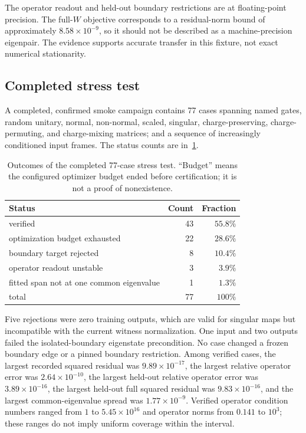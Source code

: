 \documentclass[11pt]{article}
\numberwithin{equation}{section}
\theoremstyle{definition}
\theoremstyle{remark}
\begin{document}
The operator readout and held-out boundary restrictions are at floating-point
precision.  The full-$W$ objective corresponds to a residual-norm bound of
approximately $8.58\times10^{-9}$, so it should not be described as a
machine-precision eigenpair.  The evidence supports accurate transfer in this
fixture, not exact numerical stationarity.

\subsection{Completed stress test}

A completed, confirmed smoke campaign contains 77 cases spanning named gates,
random unitary, normal, non-normal, scaled, singular, charge-preserving,
charge-permuting, and charge-mixing matrices; and a sequence of increasingly
conditioned input frames.  The status counts are in~\cref{tab:stress-status}.

\begin{table}[htbp]
  \centering
  \caption{Outcomes of the completed 77-case stress test.  ``Budget'' means the
  configured optimizer budget ended before certification; it is not a proof of
  nonexistence.}
  \label{tab:stress-status}
  \begin{tabular}{lrr}
    \toprule
    Status & Count & Fraction\\
    \midrule
    verified & 43 & $55.8\%$\\
    optimization budget exhausted & 22 & $28.6\%$\\
    boundary target rejected & 8 & $10.4\%$\\
    operator readout unstable & 3 & $3.9\%$\\
    fitted span not at one common eigenvalue & 1 & $1.3\%$\\
    \midrule
    total & 77 & $100\%$\\
    \bottomrule
  \end{tabular}
\end{table}


Five rejections were zero training outputs, which are valid for singular maps
but incompatible with the current witness normalization.  One input and two
outputs failed the isolated-boundary eigenstate precondition.
No case changed a frozen boundary edge or a pinned boundary restriction.  Among
verified cases, the largest recorded squared residual was
$9.89\times10^{-17}$, the largest relative operator error was
$2.64\times10^{-10}$, the largest held-out relative operator error was
$3.89\times10^{-16}$, the largest held-out full squared residual was
$9.83\times10^{-16}$, and the largest common-eigenvalue spread was
$1.77\times10^{-9}$.  Verified operator condition numbers ranged from $1$ to
$5.45\times10^{16}$ and operator norms from $0.141$ to $10^3$; these ranges do
not imply uniform coverage within the interval.
\end{document}
